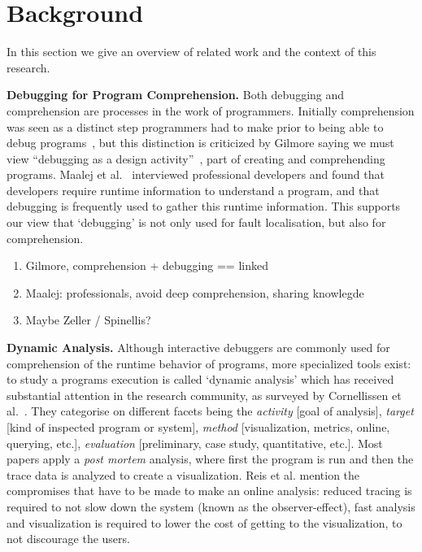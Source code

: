 \section{Background}
\label{background}
In this section we give an overview of related work 
and the context of this research.

\textbf{Debugging for Program Comprehension.}
Both debugging and comprehension are processes in the work of programmers.
Initially comprehension was seen as a distinct step programmers had to make
prior to being able to debug programs~\cite{katz1987debugging}, 
but this distinction is criticized by Gilmore saying we must view 
``debugging as a design activity''~\cite{gilmore1991models}, 
part of creating and comprehending programs. 
Maalej et al.~\cite{Maalej2014} interviewed professional developers 
and found that developers require runtime information to understand a program,
and that debugging is frequently used to gather this runtime information.
This supports our view that `debugging' is not only used for fault localisation,
but also for comprehension.
{\color{red}
\begin{enumerate}
 \item Gilmore, comprehension + debugging == linked
 \item Maalej: professionals, avoid deep comprehension, sharing knowlegde
 \item Maybe Zeller / Spinellis?
\end{enumerate}
}

\textbf{Dynamic Analysis.}
Although interactive debuggers are commonly used for comprehension 
of the runtime behavior of programs, more specialized tools exist: 
to study a programs execution is called `dynamic analysis' which has 
received substantial attention in the research community,
as surveyed by Cornellissen et al.~\cite{cornelissen2009systematic}.
They categorise on different facets being the 
\textit{activity} [goal of analysis],
\textit{target} [kind of inspected program or system],
\textit{method} [visualization, metrics, online, querying, etc.],
\textit{evaluation} [preliminary, case study, quantitative, etc.].
Most papers apply a \textit{post mortem} analysis, where first the program is run and then the trace data is analyzed to create a visualization.
Reis et al. mention the compromises
that have to be made to make an online analysis: 
reduced tracing is required to not slow down the 
system (known as the observer-effect), fast analysis 
and visualization is required to lower the cost of getting 
to the visualization, to not discourage the users.

